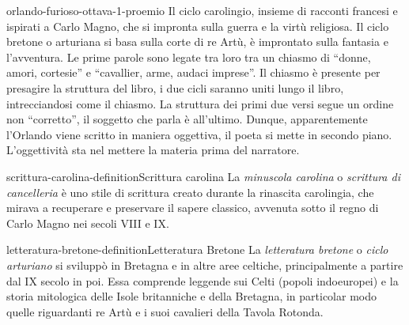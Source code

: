 \documentclass[preview]{standalone}
\begin{document}
\begin{snippet}{orlando-furioso-ottava-1-proemio}
    Il ciclo carolingio, insieme di racconti francesi e ispirati a Carlo Magno,
    che si impronta sulla guerra e la virtù religiosa.
    Il ciclo bretone o arturiana si basa sulla corte di re Artù,
    è improntato sulla fantasia e l'avventura. Le prime parole sono legate
    tra loro tra un chiasmo di “donne, amori, cortesie” e “cavallier, arme,
    audaci imprese”. Il chiasmo è presente per presagire la struttura del libro,
    i due cicli saranno uniti lungo il libro, intrecciandosi come il chiasmo. 
    La struttura dei primi due versi segue un ordine non “corretto”,
    il soggetto che parla è all'ultimo.
    Dunque, apparentemente l'Orlando viene scritto in maniera oggettiva,
    il poeta si mette in secondo piano.
    L'oggettività sta nel mettere la materia prima del narratore.
\end{snippet}

\begin{snippetdefinition}{scrittura-carolina-definition}{Scrittura carolina}
    La \textit{minuscola carolina} o \textit{scrittura di cancelleria}
    è uno stile di scrittura creato durante la rinascita carolingia,
    che mirava a recuperare e preservare il sapere classico, avvenuta
    sotto il regno di Carlo Magno nei secoli VIII e IX. 
\end{snippetdefinition}

\begin{snippetdefinition}{letteratura-bretone-definition}{Letteratura Bretone}
    La \textit{letteratura bretone} o \textit{ciclo arturiano} si sviluppò in Bretagna
    e in altre aree celtiche, principalmente a partire dal IX secolo in poi.
    Essa comprende leggende sui Celti (popoli indoeuropei)
    e la storia mitologica delle Isole britanniche e della Bretagna,
    in particolar modo quelle riguardanti re Artù e i suoi cavalieri della Tavola Rotonda.
\end{snippetdefinition}
\end{document}
